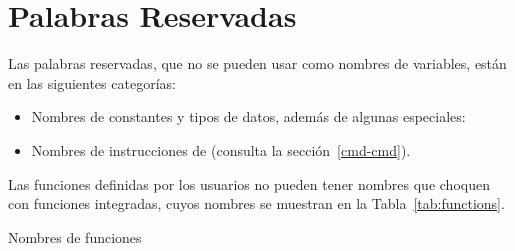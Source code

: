 \chapter{Palabras Reservadas}
\label{reswords}

Las palabras reservadas, que no se pueden usar como nombres de variables,
están en las siguientes categorías:

\begin{itemize}
\item Nombres de constantes y tipos de datos, además de algunas especiales:
  
  
\item Nombres de instrucciones de  (consulta la sección~\ref{cmd-cmd}).
\end{itemize}

Las funciones definidas por los usuarios no pueden tener nombres que choquen con
funciones integradas, cuyos nombres se muestran en la Tabla~\ref{tab:functions}.

\begin{table}[htbp]
\caption{Nombres de funciones}
\label{tab:functions}
\begin{center}

\end{center}
\end{table}
